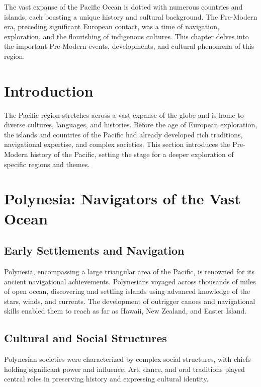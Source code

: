 \documentclass[a4paper,12pt]{book}
\begin{document}
The vast expanse of the Pacific Ocean is dotted with numerous countries and islands, each boasting a unique history and cultural background. The Pre-Modern era, preceding significant European contact, was a time of navigation, exploration, and the flourishing of indigenous cultures. This chapter delves into the important Pre-Modern events, developments, and cultural phenomena of this region.

\section{Introduction}
\label{sec:introduction-pre-modern-pacific}

The Pacific region stretches across a vast expanse of the globe and is home to diverse cultures, languages, and histories. Before the age of European exploration, the islands and countries of the Pacific had already developed rich traditions, navigational expertise, and complex societies. This section introduces the Pre-Modern history of the Pacific, setting the stage for a deeper exploration of specific regions and themes.

\section{Polynesia: Navigators of the Vast Ocean}
\label{sec:polynesia}

\subsection{Early Settlements and Navigation}
\label{subsec:polynesia-settlements-navigation}

Polynesia, encompassing a large triangular area of the Pacific, is renowned for its ancient navigational achievements. Polynesians voyaged across thousands of miles of open ocean, discovering and settling islands using advanced knowledge of the stars, winds, and currents. The development of outrigger canoes and navigational skills enabled them to reach as far as Hawaii, New Zealand, and Easter Island.

\subsection{Cultural and Social Structures}
\label{subsec:polynesia-culture-society}

Polynesian societies were characterized by complex social structures, with chiefs holding significant power and influence. Art, dance, and oral traditions played central roles in preserving history and expressing cultural identity.
\end{document}
